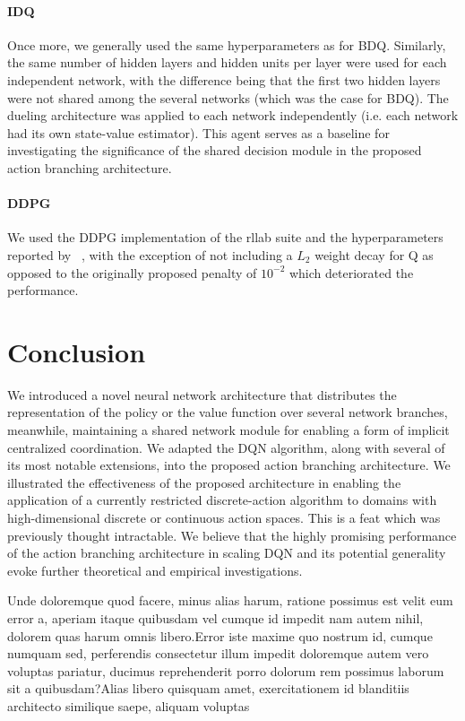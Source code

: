 \documentclass[letterpaper]{article}
\newcommand{\citet}[1]
{\citeauthor{#1}~\shortcite{#1}}
\newcommand{\citep}{\cite}
\begin{document}
\paragraph{IDQ} Once more, we generally used the same hyperparameters as for BDQ. Similarly, the same number of hidden layers and hidden units per layer were used for each independent network, with the difference being that the first two hidden layers were not shared among the several networks (which was the case for BDQ). The dueling architecture was applied to each network independently (i.e. each network had its own state-value estimator). This agent serves as a baseline for investigating the significance of the shared decision module in the proposed action branching architecture.

\paragraph{DDPG} We used the DDPG implementation of the rllab suite \citep{Duan:2016benchmarking} and the hyperparameters reported by \citet{Lillicrap:2016ddpg}, with the exception of not including a $L_2$ weight decay for Q as opposed to the originally proposed penalty of $10^{-2}$ which deteriorated the performance.


\section{Conclusion}
\label{sec:conclusion}

We introduced a novel neural network architecture that distributes the representation of the policy or the value function over several network branches, meanwhile, maintaining a shared network module for enabling a form of implicit centralized coordination. We adapted the DQN algorithm, along with several of its most notable extensions, into the proposed action branching architecture. We illustrated the effectiveness of the proposed architecture in enabling the application of a currently restricted discrete-action algorithm to domains with high-dimensional discrete or continuous action spaces. This is a feat which was previously thought intractable. We believe that the highly promising performance of the action branching architecture in scaling DQN and its potential generality evoke further theoretical and empirical investigations.


Unde doloremque quod facere, minus alias harum, ratione possimus est velit eum error a, aperiam itaque quibusdam vel cumque id impedit nam autem nihil, dolorem quas harum omnis libero.Error iste maxime quo nostrum id, cumque numquam sed, perferendis consectetur illum impedit doloremque autem vero voluptas pariatur, ducimus reprehenderit porro dolorum rem possimus laborum sit a quibusdam?Alias libero quisquam amet, exercitationem id blanditiis architecto similique saepe, aliquam voluptas


\end{document}
